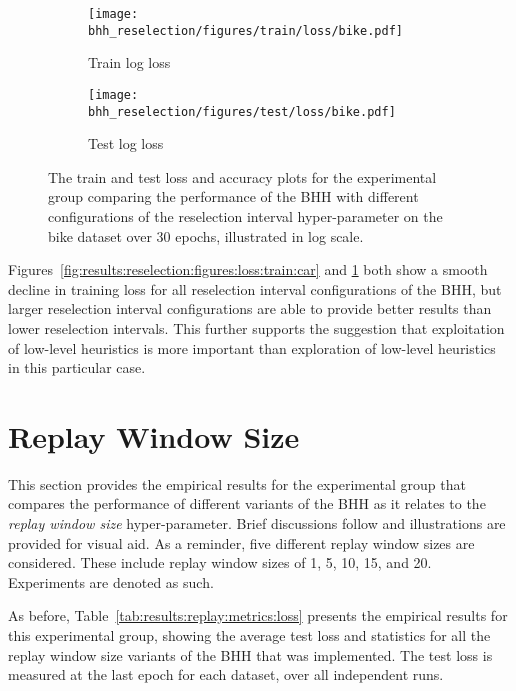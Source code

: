 \begin{figure}[htbp]
      \begin{subfigure}{0.5\textwidth}
            \centering
            \texttt{[image: bhh\_reselection/figures/train/loss/bike.pdf]}
            \caption{Train log loss}
            \label{fig:results:reselection:figures:loss:train:bike}
      \end{subfigure}
      \begin{subfigure}{0.5\textwidth}
            \centering
            \texttt{[image: bhh\_reselection/figures/test/loss/bike.pdf]}
            \caption{Test log loss}
            \label{fig:results:reselection:figures:loss:test:bike}
      \end{subfigure}
      \par\bigskip
      \caption{The train and test loss and accuracy plots for the experimental group comparing the performance of the \acs{BHH} with different configurations of the reselection interval hyper-parameter on the bike dataset over 30 epochs, illustrated in log scale.}
      \label{fig:results:reselection:figures:bike}
\end{figure}

Figures~\ref{fig:results:reselection:figures:loss:train:car} and \ref{fig:results:reselection:figures:loss:train:bike} both show a smooth decline in training loss for all reselection interval configurations of the \acs{BHH}, but larger reselection interval configurations are able to provide better results than lower reselection intervals. This further supports the suggestion that exploitation of low-level heuristics is more important than exploration of low-level heuristics in this particular case.

\section{Replay Window Size}\label{sec:results:replay}

This section provides the empirical results for the experimental group that compares the performance of different variants of the \acs{BHH} as it relates to the \textit{replay window size} hyper-parameter. Brief discussions follow and illustrations are provided for visual aid. As a reminder, five different replay window sizes are considered. These include replay window sizes of 1, 5, 10, 15, and 20. Experiments are denoted as such.

As before, Table~\ref{tab:results:replay:metrics:loss} presents the empirical results for this experimental group, showing the average test loss and statistics for all the replay window size variants of the \acs{BHH} that was implemented. The test loss is measured at the last epoch for each dataset, over all independent runs.

